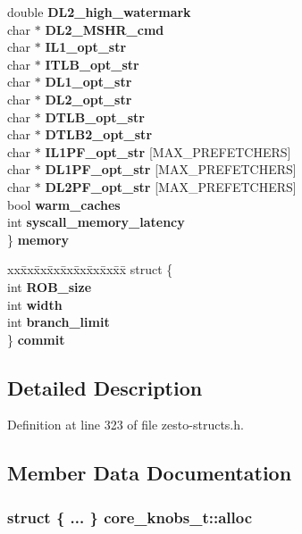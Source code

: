 \begin{CompactItemize}
\begin{tabbing}
\>double {\bf DL2\_high\_watermark}\\
\>char $\ast$ {\bf DL2\_MSHR\_cmd}\\
\>char $\ast$ {\bf IL1\_opt\_str}\\
\>char $\ast$ {\bf ITLB\_opt\_str}\\
\>char $\ast$ {\bf DL1\_opt\_str}\\
\>char $\ast$ {\bf DL2\_opt\_str}\\
\>char $\ast$ {\bf DTLB\_opt\_str}\\
\>char $\ast$ {\bf DTLB2\_opt\_str}\\
\>char $\ast$ {\bf IL1PF\_opt\_str} [MAX\_PREFETCHERS]\\
\>char $\ast$ {\bf DL1PF\_opt\_str} [MAX\_PREFETCHERS]\\
\>char $\ast$ {\bf DL2PF\_opt\_str} [MAX\_PREFETCHERS]\\
\>bool {\bf warm\_caches}\\
\>int {\bf syscall\_memory\_latency}\\
\} {\bf memory}\\

\end{tabbing}\item 
\begin{tabbing}
xx\=xx\=xx\=xx\=xx\=xx\=xx\=xx\=xx\=\kill
struct \{\\
\>int {\bf ROB\_size}\\
\>int {\bf width}\\
\>int {\bf branch\_limit}\\
\} {\bf commit}\\

\end{tabbing}\end{CompactItemize}


\subsection{Detailed Description}


Definition at line 323 of file zesto-structs.h.

\subsection{Member Data Documentation}
\subsubsection[{alloc}]{\setlength{\rightskip}{0pt plus 5cm}struct \{ ... \}   {\bf core\_\-knobs\_\-t::alloc}}\label{structcore__knobs__t_59dbf024a4199a4119773f12776f2e06}




